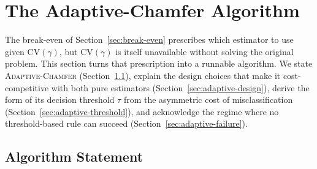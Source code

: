 \documentclass[conference]{IEEEtran}
\begin{document}
\section{The Adaptive-Chamfer Algorithm}
\label{sec:algorithm}

The break-even of Section~\ref{sec:break-even} prescribes which
estimator to use given $\mathrm{CV}(\gamma)$, but
$\mathrm{CV}(\gamma)$ is itself unavailable without solving the
original problem. This section turns that prescription into a
runnable algorithm. We state \textsc{Adaptive-Chamfer}
(Section~\ref{sec:adaptive-statement}), explain the design choices
that make it cost-competitive with both pure estimators
(Section~\ref{sec:adaptive-design}), derive the form of its decision
threshold $\tau$ from the asymmetric cost of misclassification
(Section~\ref{sec:adaptive-threshold}), and acknowledge the regime
where no threshold-based rule can succeed
(Section~\ref{sec:adaptive-failure}).

\subsection{Algorithm Statement}
\label{sec:adaptive-statement}
\end{document}
